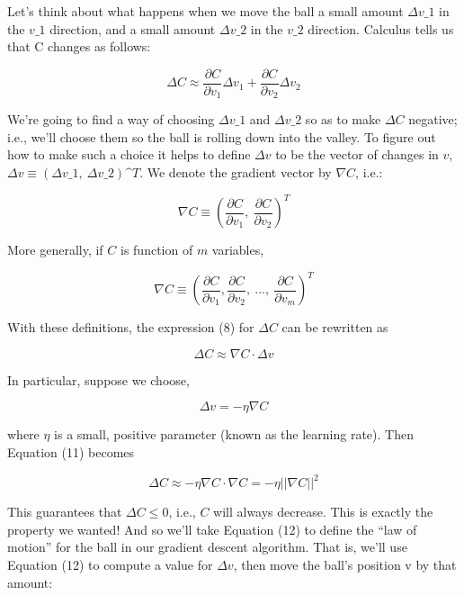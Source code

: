\documentclass[]{article}
\begin{document}
Let's think about what happens when we move the ball a small amount $
\Delta v\_1 $ in the $ v\_1 $ direction, and a small amount $
\Delta v\_2 $ in the $ v\_2 $ direction. Calculus tells us that C
changes as follows:

\begin{equation}
    \Delta C \approx \frac {\partial C}{\partial v_1} \Delta v_1 +
    \frac{\partial C}{\partial v_2} \Delta v_2
\end{equation}

We're going to find a way of choosing $ \Delta v\_1 $ and $
\Delta v\_2 $ so as to make $ \Delta C $ negative; i.e., we'll choose
them so the ball is rolling down into the valley. To figure out how to
make such a choice it helps to define $ \Delta v $ to be the vector of
changes in $ v $, $ \Delta v \equiv (\Delta v\_1, ~\Delta v\_2)\^{}T
$. We denote the gradient vector by $ \nabla C $, i.e.:

\begin{equation}
    \nabla C \equiv \left( \frac{\partial C}{\partial v_1}, \ \frac{\partial C}
    {\partial v_2} \right)^T
\end{equation}

More generally, if $ C $ is function of $ m $ variables,

\begin{equation}
    \nabla C \equiv \left( \frac{\partial C}{\partial v_1},
    \frac{\partial C}{\partial v_2}, \ ..., \ \frac{\partial C}
    {\partial v_m} \right)^T
\end{equation}

With these definitions, the expression (8) for $ \Delta C $ can be
rewritten as

\begin{equation}
    \Delta C \approx \nabla C ⋅ \Delta v
\end{equation}

In particular, suppose we choose,

\begin{equation}
    \Delta v = −\eta \nabla C
\end{equation}

where $ \eta $ is a small, positive parameter (known as the learning
rate). Then Equation (11) becomes

\begin{equation}
     \Delta C \approx −\eta \nabla C \cdot \nabla C = −\eta || \nabla C|| ^
     2
\end{equation}

This guarantees that $ \Delta C \leq 0 $, i.e., $ C $ will always
decrease. This is exactly the property we wanted! And so we'll take
Equation (12) to define the ``law of motion'' for the ball in our
gradient descent algorithm. That is, we'll use Equation (12) to compute
a value for $ \Delta v $, then move the ball's position v by that
amount:
\end{document}
